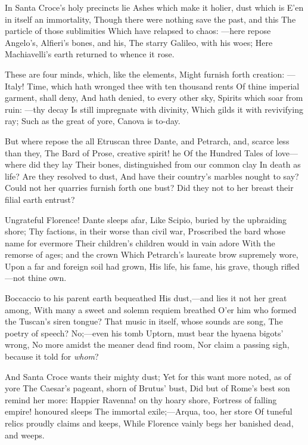 \documentclass[10pt,twocolumn]{book}
\begin{document}
   In Santa Croce's holy precincts lie
   Ashes which make it holier, dust which is
   E'en in itself an immortality,
   Though there were nothing save the past, and this
   The particle of those sublimities
   Which have relapsed to chaos: ---here repose
   Angelo's, Alfieri's bones, and his,
   The starry Galileo, with his woes;
Here Machiavelli's earth returned to whence it rose.


   These are four minds, which, like the elements,
   Might furnish forth creation: ---Italy!
   Time, which hath wronged thee with ten thousand rents
   Of thine imperial garment, shall deny,
   And hath denied, to every other sky,
   Spirits which soar from ruin: ---thy decay
   Is still impregnate with divinity,
   Which gilds it with revivifying ray;
Such as the great of yore, Canova is to-day.


   But where repose the all Etruscan three\textemdash
   Dante, and Petrarch, and, scarce less than they,
   The Bard of Prose, creative spirit! he
   Of the Hundred Tales of love---where did they lay
   Their bones, distinguished from our common clay
   In death as life?  Are they resolved to dust,
   And have their country's marbles nought to say?
   Could not her quarries furnish forth one bust?
Did they not to her breast their filial earth entrust?


   Ungrateful Florence! Dante sleeps afar,
   Like Scipio, buried by the upbraiding shore;
   Thy factions, in their worse than civil war,
   Proscribed the bard whose name for evermore
   Their children's children would in vain adore
   With the remorse of ages; and the crown
   Which Petrarch's laureate brow supremely wore,
   Upon a far and foreign soil had grown,
His life, his fame, his grave, though rifled---not thine own.


   Boccaccio to his parent earth bequeathed
   His dust,---and lies it not her great among,
   With many a sweet and solemn requiem breathed
   O'er him who formed the Tuscan's siren tongue?
   That music in itself, whose sounds are song,
   The poetry of speech?  No;---even his tomb
   Uptorn, must bear the hyaena bigots' wrong,
   No more amidst the meaner dead find room,
Nor claim a passing sigh, because it told for \textit{whom}?


   And Santa Croce wants their mighty dust;
   Yet for this want more noted, as of yore
   The Caesar's pageant, shorn of Brutus' bust,
   Did but of Rome's best son remind her more:
   Happier Ravenna! on thy hoary shore,
   Fortress of falling empire! honoured sleeps
   The immortal exile;---Arqua, too, her store
   Of tuneful relics proudly claims and keeps,
While Florence vainly begs her banished dead, and weeps.
\end{document}
